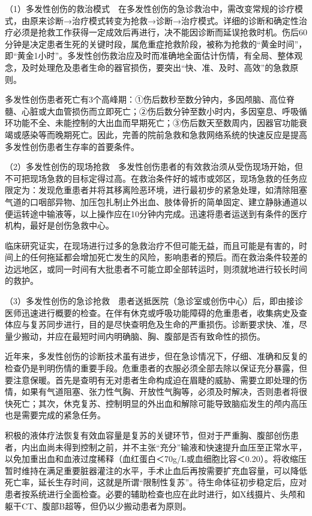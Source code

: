 （1）多发性创伤的救治模式　在多发性创伤的急诊救治中，需改变常规的诊疗模式，由原来诊断→治疗模式转变为抢救→诊断→治疗模式。详细的诊断和确定性治疗必须是抢救工作获得一定成效后再进行，决不能因诊断而延误抢救时机。伤后60分钟是决定患者生死的关键时段，属危重症抢救阶段，被称为抢救的“黄金时间”，即“黄金1小时”。多发性创伤救治应及时而准确地全面估计伤情，有全局、整体观念，及时处理危及患者生命的器官损伤，要突出“快、准、及时、高效”的急救原则。

多发性创伤患者死亡有3个高峰期：①伤后数秒至数分钟内，多因颅脑、高位脊髓、心脏或大血管损伤而立即死亡；②伤后数分钟至数小时内，多因窒息、呼吸循环功能不全、未能控制的大出血而早期死亡；③伤后数天至数周内，因器官功能衰竭或感染等而晚期死亡。因此，完善的院前急救和急救网络系统的快速反应是提高多发性创伤患者生存率的首要条件。

（2）多发性创伤的现场抢救　多发性创伤患者的有效救治须从受伤现场开始，但不可把现场急救的目标定得过高。在救治条件好的城市或郊区，现场急救的任务应限定为：发现危重患者并将其移离险恶环境，进行最初步的紧急处理，如清除阻塞气道的口咽部异物、加压包扎制止外出血、肢体骨折的简单固定、建立静脉通道以便运转途中输液等，以上操作应在10分钟内完成。迅速将患者运送到有条件的医疗机构，最好是创伤急救中心。

临床研究证实，在现场进行过多的急救治疗不但可能无益，而且可能是有害的，时间上的任何拖延都会增加死亡发生的风险，影响患者的预后。而在救治条件较差的边远地区，或同一时间有大批患者不可能立即全部转运时，则须就地进行较长时间的救护。

（3）多发性创伤的急诊抢救　患者送抵医院（急诊室或创伤中心）后，即由接诊医师迅速进行概要的检查。在伴有休克或呼吸功能障碍的危重患者，收集病史及查体应与复苏同步进行，目的是尽快查明危及生命的严重损伤。诊断要求快、准，尽量少搬动，并应在最短时间内明确脑、胸、腹部是否有致命性的损伤。

近年来，多发性创伤的诊断技术虽有进步，但在急诊情况下，仔细、准确和反复的检查仍是判明伤情的重要手段。危重患者的衣服必须全部去除以保证充分暴露，但要注意保暖。首先是查明有无对患者生命构成迫在眉睫的威胁、需要立即处理的伤情，如果有气道阻塞、张力性气胸、开放性气胸等，必须及时解决，否则患者将很快死亡；其次，休克复苏、控制明显的外出血和解除可能导致脑疝发生的颅内高压也是需要完成的紧急任务。

积极的液体疗法恢复有效血容量是复苏的关键环节，但对于严重胸、腹部创伤患者，内出血尚未得到控制之前，并不主张“充分”输液和快速提升血压至正常水平，以免加重出血和血液过度稀释（血红蛋白＜70g/L或血细胞比容＜0.20）。将收缩压暂时维持在满足重要脏器灌注的水平，手术止血后再按需要扩充血容量，可以降低死亡率，延长生存时间，这就是所谓“限制性复苏”。待生命体征初步稳定后，应对患者按系统进行全面检查。必要的辅助检查也应在此时进行，如X线摄片、头颅和躯干CT、腹部B超等，但仍以少搬动患者为原则。

